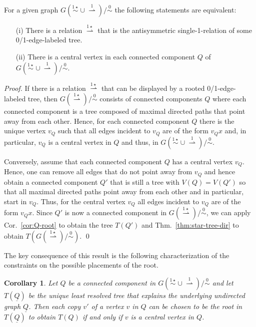 \documentclass[smallextended]{svjour3}
\newcommand{\Ro}{\mathrel{\overset{0}{\sim}}}
\newcommand{\Rlstar}{\mathrel{\overset{1\star}{\sim}}}
\newcommand{\Rldstar}{\mathrel{\overset{1\star}{\rightharpoonup}}}
\newcommand{\Rld}{\mathrel{\overset{1}{\rightharpoonup}}}
\newtheorem{cor}[thm]{Corollary}
\begin{document}
\begin{lemma}
  For a given graph $G(\Rlstar\cup\Rld)/\Ro$ the following statements
  are equivalent:
  \begin{itemize}
  \item[(i)] There is a relation $\Rldstar$ that is the antisymmetric
    single-1-relation of some 0/1-edge-labeled tree.
  \item[(ii)] There is a central vertex in each connected component $Q$ of
    $G(\Rlstar\cup\Rld)/\Ro$.
  \end{itemize}
\end{lemma}
\begin{proof}
  If there is a relation $\Rldstar$ that can be displayed by a rooted
  0/1-edge-labeled tree, then  $G(\Rldstar)/\Ro$ consists of
  connected components $Q$ where each connected component is a tree
  composed of maximal directed paths that point away from each
  other. Hence, for each connected component $Q$ there is the unique vertex
  $v_Q$ such that all edges incident to $v_Q$ are of the form $v_Qx$ and,
  in particular, $v_Q$ is a central vertex in $Q$ and thus, in
  $G(\Rlstar\cup\Rld)/\Ro$.

  Conversely, assume that each connected component $Q$ has a central
  vertex $v_Q$. Hence, one can remove all edges that do not point away from
  $v_Q$ and hence obtain a connected component $Q'$ that is still a tree
  with $V(Q)=V(Q')$ so that all maximal directed paths point away from each
  other and in particular, start in $v_Q$.  Thus, for the central vertex
  $v_Q$ all edges incident to $v_Q$ are of the form $v_Qx$. Since $Q'$ is
  now a connected component in $G(\Rldstar)/\Ro$, we can apply Cor.\
  \ref{cor:Q-root} to obtain the tree $T(Q')$ and
  Thm.\ \ref{thm:star-tree-dir} to obtain $T(G(\Rldstar)/\Ro)$. \qed
\end{proof}

The key consequence of this result is the following characterization of the
constraints on the possible placements of the root.

\begin{cor}
  Let $Q$ be a connected component in $G(\Rlstar\cup\Rld)/\Ro$ and let
  $T(\underline{Q})$ be the unique least resolved tree that explains the
  underlying undirected graph $\underline{Q}$.  Then each copy $v'$ of a
  vertex $v$ in $Q$ can be chosen to be the root in $T(\underline{Q})$ to
  obtain $T(Q)$ if and only if $v$ is a central vertex in $Q$.
\end{cor}
\end{document}
